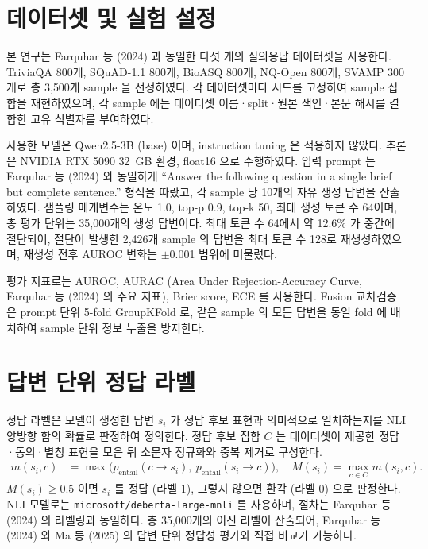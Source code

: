 
\section{데이터셋 및 실험 설정}\label{sec:exp_setup}

본 연구는 Farquhar 등 (2024)\cite{farquhar2024} 과 동일한 다섯 개의 질의응답 데이터셋을 사용한다. TriviaQA\cite{triviaqa} 800개, SQuAD-1.1\cite{squad} 800개, BioASQ\cite{bioasq} 800개, NQ-Open\cite{nqopen} 800개, SVAMP\cite{svamp} 300개로 총 3{,}500개 sample 을 선정하였다. 각 데이터셋마다 시드를 고정하여 sample 집합을 재현하였으며, 각 sample 에는 데이터셋 이름·split·원본 색인·본문 해시를 결합한 고유 식별자를 부여하였다.

사용한 모델은 Qwen2.5-3B (base)\cite{qwen25} 이며, instruction tuning 은 적용하지 않았다. 추론은 NVIDIA RTX 5090 32~GB 환경, float16 으로 수행하였다. 입력 prompt 는 Farquhar 등 (2024) 와 동일하게 ``Answer the following question in a single brief but complete sentence.'' 형식을 따랐고, 각 sample 당 10개의 자유 생성 답변을 산출하였다. 샘플링 매개변수는 온도 1.0, top-p 0.9, top-k 50, 최대 생성 토큰 수 64이며, 총 평가 단위는 35{,}000개의 생성 답변이다. 최대 토큰 수 64에서 약 12.6\% 가 중간에 절단되어, 절단이 발생한 2{,}426개 sample 의 답변을 최대 토큰 수 128로 재생성하였으며, 재생성 전후 AUROC 변화는 $\pm$0.001 범위에 머물렀다.

평가 지표로는 AUROC, AURAC (Area Under Rejection-Accuracy Curve, Farquhar 등 (2024) 의 주요 지표), Brier score, ECE 를 사용한다. Fusion 교차검증은 prompt 단위 5-fold GroupKFold 로, 같은 sample 의 모든 답변을 동일 fold 에 배치하여 sample 단위 정보 누출을 방지한다.

\section{답변 단위 정답 라벨}\label{sec:label}

정답 라벨은 모델이 생성한 답변 $s_i$ 가 정답 후보 표현과 의미적으로 일치하는지를 NLI 양방향 함의 확률로 판정하여 정의한다. 정답 후보 집합 $C$ 는 데이터셋이 제공한 정답·동의·별칭 표현을 모은 뒤 소문자 정규화와 중복 제거로 구성한다.
\begin{align*}
m(s_i, c) &= \max\bigl(p_\text{entail}(c \to s_i),\ p_\text{entail}(s_i \to c)\bigr), \quad M(s_i) = \max_{c \in C} m(s_i, c).
\end{align*}
$M(s_i) \geq 0.5$ 이면 $s_i$ 를 정답 (라벨 1), 그렇지 않으면 환각 (라벨 0) 으로 판정한다. NLI 모델로는 \texttt{microsoft/deberta-large-mnli} 를 사용하며, 절차는 Farquhar 등 (2024) 의 라벨링과 동일하다. 총 35{,}000개의 이진 라벨이 산출되어, Farquhar 등 (2024) 와 Ma 등 (2025) 의 답변 단위 정답성 평가와 직접 비교가 가능하다.

